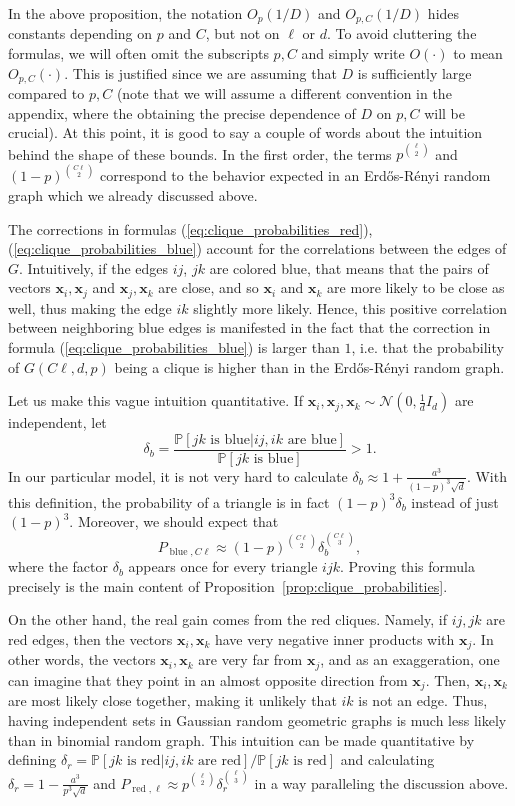 \documentclass[11pt]{amsart}
\theoremstyle{definition}
\def\cN{\mathcal{N}}
\def\Pb{\mathbb{P}}
\def\bx{\boldsymbol{x}}
\DeclareMathOperator{\red}{red}
\DeclareMathOperator{\blue}{blue}
\begin{document}
In the above proposition, the notation $O_p(1/D)$ and $O_{p, C}(1/D)$ hides constants depending on $p$ and $C$, but not on $\ell$ or $d$. To avoid cluttering the formulas, we will often omit the subscripts $p, C$ and simply write $O(\cdot)$ to mean $O_{p, C}(\cdot)$. This is justified since we are assuming that $D$ is sufficiently large compared to $p, C$ (note that we will assume a different convention in the appendix, where the obtaining the precise dependence of $D$ on $p, C$ will be crucial). At this point, it is good to say a couple of words about the intuition behind the shape of these bounds. In the first order, the terms $p^{\binom{\ell}{2}}$ and $(1-p)^{\binom{C\ell}{2}}$ correspond to the behavior expected in an Erd\H{o}s-R\'enyi random graph which we already discussed above.

The corrections in formulas (\ref{eq:clique_probabilities_red}), (\ref{eq:clique_probabilities_blue}) account for the correlations between the edges of $G$. Intuitively, if the edges $ij$, $jk$ are colored blue, that means that the pairs of vectors $\bx_i, \bx_j$ and $\bx_j, \bx_k$ are close, and so $\bx_i$ and $\bx_k$ are more likely to be close as well, thus making the edge $ik$ slightly more likely. Hence, this positive correlation between neighboring blue edges is manifested in the fact that the correction in formula (\ref{eq:clique_probabilities_blue}) is larger than $1$, i.e. that the probability of $G(C\ell, d, p)$ being a clique is higher than in the Erd\H{o}s-R\'enyi random graph.

Let us make this vague intuition quantitative. If $\bx_i, \bx_j, \bx_k\sim \cN(0, \frac{1}{d}I_d)$ are independent, let
{\smaller[0.3]
\[\delta_b=\frac{\Pb[jk \text{ is blue}|ij, ik \text{ are blue}]}{\Pb[jk \text{ is blue}]}>1.\]
}
In our particular model, it is not very hard to calculate $\delta_b\approx 1+\frac{a^3}{(1-p)^3\sqrt{d}}$. With this definition, the probability of a triangle is in fact $(1-p)^3\delta_b$ instead of just $(1-p)^3$. Moreover, we should expect that
{\smaller[0.3]
\[P_{\blue, C\ell}\approx (1-p)^{\binom{C\ell}{2}}\delta_b^{\binom{C\ell}{3}},\]
}
where the factor $\delta_b$ appears once for every triangle $i j k$. Proving this formula precisely is the main content of Proposition~\ref{prop:clique_probabilities}. 

On the other hand, the real gain comes from the red cliques. Namely, if $ij, jk$ are red edges, then the vectors $\bx_i, \bx_k$ have very negative inner products with $\bx_j$. In other words, the vectors $\bx_i, \bx_k$ are very far from $\bx_j$, and as an exaggeration, one can imagine that they point in an almost opposite direction from $\bx_j$. Then, $\bx_i, \bx_k$ are most likely close together, making it unlikely that $ik$ is not an edge. Thus, having independent sets in Gaussian random geometric graphs is much less likely than in binomial random graph. This intuition can be made quantitative by defining $\delta_r={\Pb[jk \text{ is red}|ij, ik \text{ are red}]}/{\Pb[jk \text{ is red}]}$ and calculating $\delta_r=1-\frac{a^3}{p^3\sqrt{d}}$ and $P_{\red, \ell}\approx p^{\binom{\ell}{2}}\delta_r^{\binom{\ell}{3}}$ in a way paralleling the discussion above.
\end{document}
